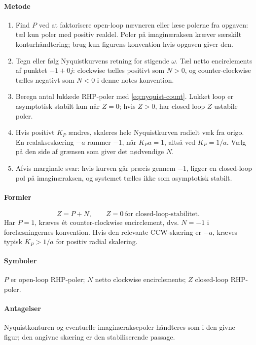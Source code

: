 \paragraph{Metode}
\begin{enumerate}
\item Find \(P\) ved at faktorisere open-loop nævneren eller læse polerne fra opgaven:
      tæl kun poler med positiv realdel. Poler på imaginæraksen kræver særskilt
      konturhåndtering; brug kun figurens konvention hvis opgaven giver den.
\item Tegn eller følg Nyquistkurvens retning for stigende \(\omega\). Tæl netto
      encirclements af punktet \(-1+0j\): clockwise tælles positivt som \(N>0\), og
      counter-clockwise tælles negativt som \(N<0\) i denne notes konvention.
\item Beregn antal lukkede RHP-poler med \eqref{eq:nyquist-count}. Lukket loop er
      asymptotisk stabilt kun når \(Z=0\); hvis \(Z>0\), har closed loop \(Z\) ustabile
      poler.
\item Hvis positivt \(K_P\) ændres, skaleres hele Nyquistkurven radielt væk fra origo.
      En realakseskæring \(-a\) rammer \(-1\), når \(K_Pa=1\), altså ved
      \(K_P=1/a\). Vælg på den side af grænsen som giver det nødvendige \(N\).
\item Afvis marginale svar: hvis kurven går præcis gennem \(-1\), ligger en closed-loop
      pol på imaginæraksen, og systemet tælles ikke som asymptotisk stabilt.
\end{enumerate}

\paragraph{Formler}
\begin{equation}
\label{eq:nyquist-count}
Z=P+N,\qquad Z=0\ \text{for closed-loop-stabilitet.}
\end{equation}
Har \(P=1\), kræves ét counter-clockwise encirclement, dvs. \(N=-1\) i
forelæsningernes konvention. Hvis den relevante CCW-skæring er \(-a\), kræves
typisk \(K_P>1/a\) for positiv radial skalering.

\paragraph{Symboler}
\(P\) er open-loop RHP-poler; \(N\) netto clockwise encirclements; \(Z\) closed-loop
RHP-poler.

\paragraph{Antagelser}
Nyquistkonturen og eventuelle imaginæraksepoler håndteres som i den givne figur;
den angivne skæring er den stabiliserende passage.

